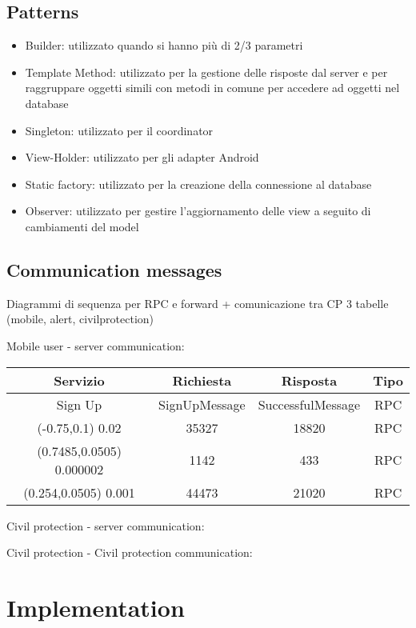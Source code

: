 \documentclass[a4paper,12pt]{report}
\begin{document}
\section{Patterns}
\begin{itemize}
\item Builder: utilizzato quando si hanno più di 2/3 parametri
\item Template Method: utilizzato per la gestione delle risposte dal server e per raggruppare oggetti simili con metodi in comune per accedere ad oggetti nel database
\item Singleton: utilizzato per il coordinator
\item View-Holder: utilizzato per gli adapter Android
\item Static factory: utilizzato per la creazione della connessione al database
\item Observer: utilizzato per gestire l'aggiornamento delle view a seguito di cambiamenti del model
\end{itemize}

\section{Communication messages}
Diagrammi di sequenza per RPC e forward + comunicazione tra CP
3 tabelle (mobile, alert, civilprotection)

Mobile user - server communication:

\begin{center}
\begin{tabular}{ |c|c|c|c| } 
\hline
Servizio 			& Richiesta 	& Risposta	& Tipo 	\\
\hline
Sign Up  				& SignUpMessage		&  SuccessfulMessage 	& RPC	\\ 
(-0.75,0.1) 0.02 			& 35327 		&  18820	& RPC	\\ 
(0.7485,0.0505) 0.000002 	& 1142 			&  433		& RPC	\\ 
(0.254,0.0505) 0.001		& 44473       	&  21020	& RPC	\\
\hline
\end{tabular}
\end{center}

Civil protection - server communication:

Civil protection - Civil protection communication:


\chapter{Implementation}
\end{document}
